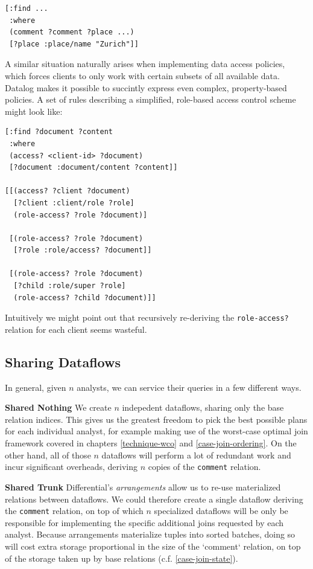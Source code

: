 \documentclass[../catalog.tex]{subfiles}
\begin{document}
\begin{verbatim}
[:find ...
 :where
 (comment ?comment ?place ...)
 [?place :place/name "Zurich"]]
\end{verbatim}

A similar situation naturally arises when implementing data access
policies, which forces clients to only work with certain subsets of
all available data. Datalog makes it possible to succintly express
even complex, property-based policies. A set of rules describing a
simplified, role-based access control scheme might look like:

\begin{verbatim}
[:find ?document ?content
 :where
 (access? <client-id> ?document)
 [?document :document/content ?content]]

[[(access? ?client ?document)
  [?client :client/role ?role]
  (role-access? ?role ?document)]

 [(role-access? ?role ?document)
  [?role :role/access? ?document]]
 
 [(role-access? ?role ?document)
  [?child :role/super ?role]
  (role-access? ?child ?document)]]
\end{verbatim}

Intuitively we might point out that recursively re-deriving the
\texttt{role-access?} relation for each client seems wasteful.

\subsection{Sharing Dataflows}

In general, given $n$ analysts, we can service their queries in a few
different ways.

\textbf{Shared Nothing} We create $n$ indepedent dataflows, sharing
only the base relation indices. This gives us the greatest freedom to
pick the best possible plans for each individual analyst, for example
making use of the worst-case optimal join framework covered in
chapters \ref{technique-wco} and \ref{case-join-ordering}. On the
other hand, all of those $n$ dataflows will perform a lot of redundant
work and incur significant overheads, deriving $n$ copies of the
\texttt{comment} relation.

\textbf{Shared Trunk} Differential's \emph{arrangements} allow us to
re-use materialized relations between dataflows. We could therefore
create a single dataflow deriving the \texttt{comment} relation, on
top of which $n$ specialized dataflows will be only be responsible for
implementing the specific additional joins requested by each
analyst. Because arrangements materialize tuples into sorted batches,
doing so will cost extra storage proportional in the size of the
`comment` relation, on top of the storage taken up by base relations
(c.f. \ref{case-join-state}).
\end{document}
